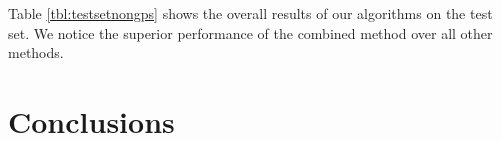 \documentclass{acm_proc_article-me11_tweaked}
\begin{document}
Table \ref{tbl:testsetnongps} shows the overall results of our algorithms on the test set. We notice the superior performance of the combined method over all other methods.



\section{Conclusions}


%

\end{document}
